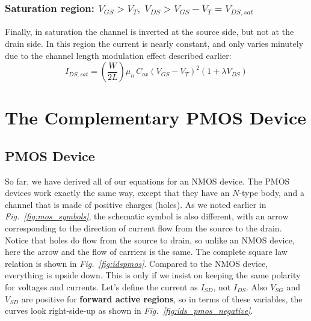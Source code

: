 \subsubsection{\textbf{Saturation region:} $V_{GS} > V_T,\;V_{DS} > V_{GS} - V_T = V_{DS,sat}$}
Finally, in saturation the channel is inverted at the source side, but not at the drain side.  In this region the current is nearly constant, and only varies minutely due to the channel length modulation effect described earlier:
    \begin{equation*}
        \boxed{ I_{DS,sat} = \left( \frac{W}{2L} \right) \mu_n\,C_{ox} {\left( V_{GS} - {V_T} \right)}^2 (1 + \lambda V_{DS}) }
    \end{equation*}
\section{The Complementary PMOS Device}
\subsection{PMOS Device}
So far, we have derived all of our equations for an NMOS device.  The PMOS devices work exactly the same way, except that they have an $N$-type body, and a channel that is made of positive charges (holes).  As we noted earlier in \emph{Fig.~\ref{fig:mos_symbols}}, the schematic symbol is also different, with an arrow corresponding to the direction of current flow from the source to the drain.  Notice that holes do flow from the source to drain, so unlike an NMOS device, here the arrow and the flow of carriers is the same.  The complete square law relation is shown in \emph{Fig.~\ref{fig:idspmos}}.  Compared to the NMOS device, everything is upside down. This is only if we insist on keeping the same polarity for voltages and currents.  Let's define the current as $I_{SD}$, not $I_{DS}$.   Also $V_{SG}$ and $V_{SD}$ are positive for \textbf{forward active regions}, so in terms of these variables, the curves look right-side-up as shown in \emph{Fig.~\ref{fig:ids_pmos_negative}}.

